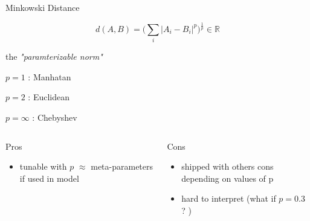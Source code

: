 \documentclass{beamer}
\begin{document}
\begin{frame}{Minkowski Distance}

$$d(A,B)= \big(\sum_i|A_i-B_i|^p\big)^{\frac{1}{p}} \in \mathbb{R}$$


the \textit{"paramterizable norm"}

$p= 1$ : Manhatan

$p= 2$ : Euclidean 

$p = \infty$ : Chebyshev

\begin{scriptsize}
\begin{columns}[T,onlytextwidth]
\begin{block}{Pros}
\begin{itemize}
  \item tunable with $p$ $\approx$ meta-parameters if used in model
\end{itemize}
\end{block}
\begin{block}{Cons}
\begin{spacing}{0.9}
\begin{itemize}
  \item shipped with others cons depending on values of p
  \item hard to interpret (what if $p=0.3$ ? )
\end{itemize}
\end{spacing}
\end{block}
\end{columns}
\end{scriptsize}




\end{frame}
\end{document}
